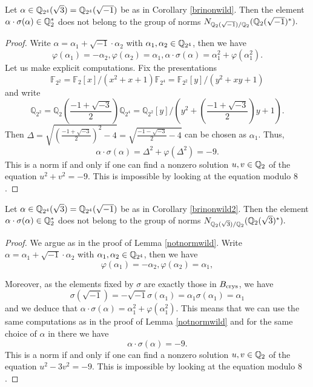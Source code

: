 \begin{lemma}
\notready\label{notnormwild}
Let $\alpha \in \mathbb{Q}_{2^4}(\sqrt{3})=\mathbb{Q}_{2^4}(\sqrt{-1})$ be as in Corollary \ref{brinonwild}. Then the element $\alpha  \cdot \sigma(\alpha) \in \mathbb{Q}_2^*$ does not belong to the group of norms $ N_{\mathbb{Q}_2(\sqrt{-1})/\mathbb{Q}_2}(\mathbb{Q}_2(\sqrt{-1})^*).$
\end{lemma}
\begin{proof}
 Write $\alpha= \alpha_1+\sqrt{-1}\cdot\alpha_2$ with $\alpha_1,\alpha_2 \in \mathbb{Q}_{2^4}$, then we have
 \[\varphi(\alpha_1)=-\alpha_2,   \varphi(\alpha_2)=\alpha_1,  \alpha  \cdot \sigma(\alpha)=\alpha_1^2+\varphi(\alpha_1^2).\]
 Let us make explicit computations. Fix the presentations
\[\mathbb{F}_{2^2}=\mathbb{F}_{2}[x]/(x^2+x+1)  \mathbb{F}_{2^4}=\mathbb{F}_{2^2}[y]/(y^2+xy+1)\]
and write
\[\mathbb{Q}_{2^2}=\mathbb{Q}_{2}(\frac{-1+\sqrt{-3}}{2})  \mathbb{Q}_{2^4}=\mathbb{Q}_{2^2}[y]/(y^2+(\frac{-1+\sqrt{-3}}{2})y+1).\]
Then $\Delta=\sqrt{(\frac{-1+\sqrt{-3}}{2})^2-4}=\sqrt{\frac{-1-\sqrt{-3}}{2}-4}$ can be chosen as $\alpha_1$. Thus,
\[\alpha  \cdot \sigma(\alpha)=\Delta^2 + \varphi(\Delta^2)= -9.\]
This is a norm if and only if one can find a nonzero solution $u,v \in \mathbb{Q}_2$ of the equation $u^2+v^2=-9$. This is impossible by looking at the equation modulo $8$.
\end{proof}

\begin{lemma}
\notready\label{notnormwild2}
Let $\alpha \in \mathbb{Q}_{2^4}(\sqrt{3})=\mathbb{Q}_{2^4}(\sqrt{-1})$ be as in Corollary \ref{brinonwild2}. Then the element $\alpha  \cdot \sigma(\alpha) \in \mathbb{Q}_2^*$ does not belong to the group of norms $ N_{\mathbb{Q}_2(\sqrt{3})/\mathbb{Q}_2}(\mathbb{Q}_2(\sqrt{3})^*).$
\end{lemma}
\begin{proof}
 We argue as in the proof of Lemma \ref{notnormwild}. Write $\alpha= \alpha_1+\sqrt{-1}\cdot \alpha_2$ with $\alpha_1,\alpha_2 \in \mathbb{Q}_{2^4}$, then we have
\[\varphi(\alpha_1)=-\alpha_2,   \varphi(\alpha_2)=\alpha_1, \]

 Moreover, as the elements fixed by $\sigma$ are exactly those in $B_{\textnormal{crys}}$, we have
 \[ \sigma(\sqrt{-1})=-\sqrt{-1}  \sigma(\alpha_1)= \alpha_1  \sigma(\alpha_1)= \alpha_1 \]
 and we deduce that $\alpha  \cdot \sigma(\alpha)=\alpha_1^2+\varphi(\alpha_1^2).$ This means that we can use the same computations as in  the proof of Lemma \ref{notnormwild} and for the same choice of $\alpha$ in there we have \[\alpha  \cdot \sigma(\alpha) = -9.\]
This is a norm if and only if one can find a nonzero solution $u,v \in \mathbb{Q}_2$ of the equation $u^2 - 3 v^2=-9$. This is impossible by looking at the equation modulo $8$.
\end{proof}

